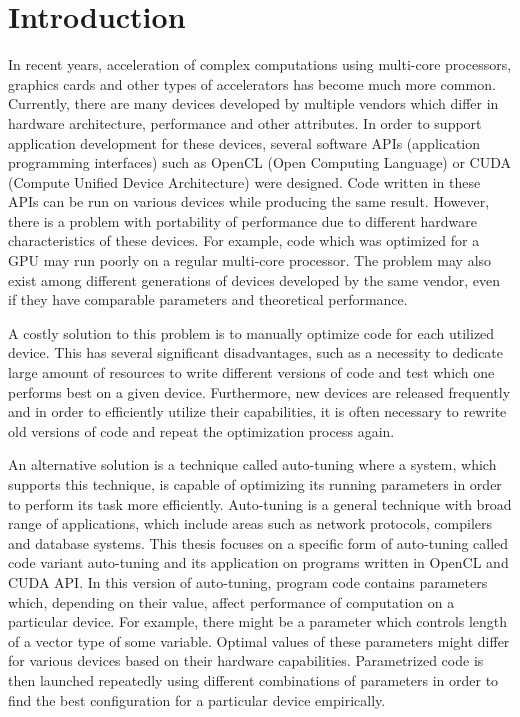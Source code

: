 \documentclass
[
    digital, %
    oneside, %
    table, %
    nolof, %
    nolot, %
    nocover %
]{fithesis3}
\begin{document}
\chapter{Introduction}
In recent years, acceleration of complex computations using multi-core processors, graphics cards and other types of accelerators has become
much more common. Currently, there are many devices developed by multiple vendors which differ in hardware architecture, performance and other
attributes. In order to support application development for these devices, several software APIs (application programming interfaces) such as
OpenCL (Open Computing Language) or CUDA (Compute Unified Device Architecture) were designed. Code written in these APIs can be run on various
devices while producing the same result. However, there is a problem with portability of performance due to different hardware characteristics of
these devices. For example, code which was optimized for a GPU may run poorly on a regular multi-core processor. The problem may also exist among
different generations of devices developed by the same vendor, even if they have comparable parameters and theoretical performance.

A costly solution to this problem is to manually optimize code for each utilized device. This has several significant disadvantages, such as
a necessity to dedicate large amount of resources to write different versions of code and test which one performs best on a given device. Furthermore,
new devices are released frequently and in order to efficiently utilize their capabilities, it is often necessary to rewrite old versions of code and
repeat the optimization process again.

An alternative solution is a technique called auto-tuning where a system, which supports this technique, is capable of optimizing its running parameters
in order to perform its task more efficiently. Auto-tuning is a general technique with broad range of applications, which include areas such as network
protocols, compilers and database systems. This thesis focuses on a specific form of auto-tuning called code variant auto-tuning and its application on
programs written in OpenCL and CUDA API. In this version of auto-tuning, program code contains parameters which, depending on their value, affect
performance of computation on a particular device. For example, there might be a parameter which controls length of a vector type of some variable.
Optimal values of these parameters might differ for various devices based on their hardware capabilities. Parametrized code is then launched repeatedly
using different combinations of parameters in order to find the best configuration for a particular device empirically.
\end{document}
